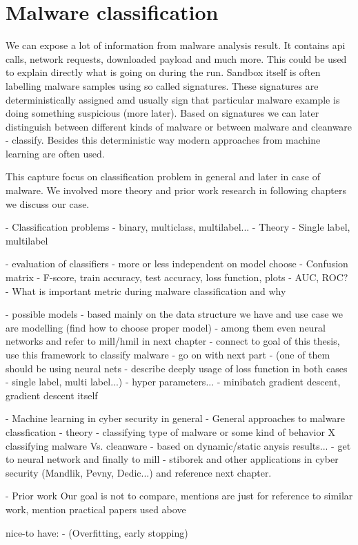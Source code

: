\chapter{Malware classification}
We can expose a lot of information from malware analysis result. It contains api calls, network requests, downloaded payload and much more. This could be used to explain directly what is going on during the run. Sandbox itself is often labelling malware samples using so called signatures. These signatures are deterministically assigned amd usually sign that particular malware example is doing something suspicious (more later). Based on signatures we can later distinguish between different kinds of malware or between malware and cleanware - classify. Besides this deterministic way modern approaches from machine learning are often used.

This capture focus on classification problem in general and later in case of malware. We involved more theory and prior work research in following chapters we discuss our case.

- Classification problems - binary, multiclass, multilabel...
- Theory
- Single label, multilabel

- evaluation of classifiers - more or less independent on model choose
  - Confusion matrix
  - F-score, train accuracy, test accuracy, loss function, plots
        - AUC, ROC?
  - What is important metric during malware classification and why

- possible models - based mainly on the data structure we have and use case we are modelling (find how to choose proper model)
    - among them even neural networks and refer to mill/hmil in next chapter - connect to goal of this thesis, use this framework to classify malware - go on with next part
- (one of them should be using neural nets - describe deeply usage of loss function in both cases - single label, multi label...)
- hyper parameters...
- minibatch gradient descent, gradient descent itself



- Machine learning in cyber security in general
- General approaches to malware classfication - theory
    - classifying type of malware or some kind of behavior X classifying malware Vs. cleanware
    - based on dynamic/static anysis results...
    - get to neural network and finally to mill - stiborek and other applications in cyber security (Mandlik, Pevny, Dedic...) and reference next chapter.


- Prior work
Our goal is not to compare, mentions are just for reference to similar work, mention practical papers used above

nice-to have:
- (Overfitting, early stopping)



